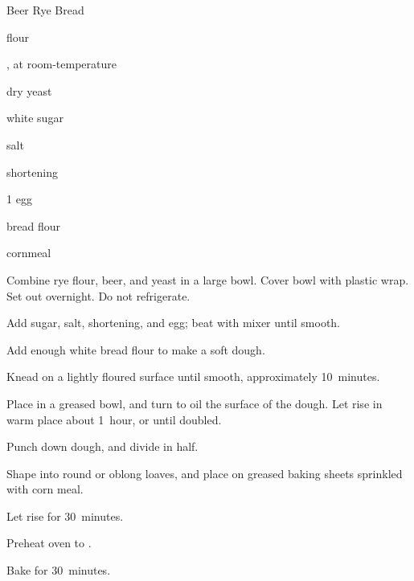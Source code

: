 \begin{recipe}{Beer Rye Bread}{}{}

\begin{ingredients}
\item {}  flour
\item \C{1\half} , at room-temperature 
\item \tp{4\half} dry yeast
\item {} white sugar
\item {} salt
\item {} shortening
\item 1 egg
\item {} bread flour
\item {} cornmeal
\end{ingredients}

\begin{directions}
\item Combine rye flour, beer, and yeast in a large bowl. Cover bowl with plastic wrap. Set out overnight. Do not refrigerate.
\item Add sugar, salt, shortening, and egg; beat with mixer until smooth.
\item Add enough white bread flour to make a soft dough.
\item Knead on a lightly floured surface until smooth, approximately 10~minutes.
\item Place in a greased bowl, and turn to oil the surface of the dough. Let rise in warm place about 1~hour, or until doubled.
\item Punch down dough, and divide in half.
\item Shape into round or oblong loaves, and place on greased baking sheets sprinkled with corn meal.
\item Let rise for 30~minutes.
\item Preheat oven to .
\item Bake for 30~minutes.
\end{directions}

\end{recipe}
